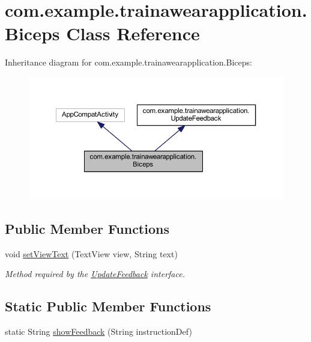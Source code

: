 \hypertarget{classcom_1_1example_1_1trainawearapplication_1_1_biceps}{}\section{com.\+example.\+trainawearapplication.\+Biceps Class Reference}
\label{classcom_1_1example_1_1trainawearapplication_1_1_biceps}


Inheritance diagram for com.\+example.\+trainawearapplication.\+Biceps\+:
\nopagebreak
\begin{figure}[H]
\begin{center}
\leavevmode
\includegraphics[width=350pt]{classcom_1_1example_1_1trainawearapplication_1_1_biceps__inherit__graph}
\end{center}
\end{figure}
\subsection*{Public Member Functions}
\begin{DoxyCompactItemize}
\item 
void \mbox{\hyperlink{classcom_1_1example_1_1trainawearapplication_1_1_biceps_a6e1ab1b99cd05b29fb7346b0642b7d0e}{set\+View\+Text}} (Text\+View view, String text)
\begin{DoxyCompactList}\small\item\em Method required by the \mbox{\hyperlink{interfacecom_1_1example_1_1trainawearapplication_1_1_update_feedback}{Update\+Feedback}} interface. \end{DoxyCompactList}\end{DoxyCompactItemize}
\subsection*{Static Public Member Functions}
\begin{DoxyCompactItemize}
\item 
static String \mbox{\hyperlink{classcom_1_1example_1_1trainawearapplication_1_1_biceps_ad9e0fdf8309b31736b338a3b29079b24}{show\+Feedback}} (String instruction\+Def)
\end{DoxyCompactItemize}
